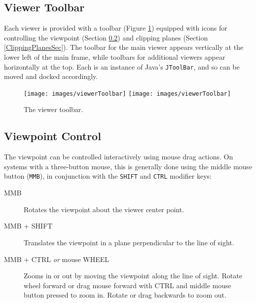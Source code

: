 \documentclass{article}
\begin{document}
\subsection{Viewer Toolbar}

Each viewer is provided with a toolbar (Figure \ref{ViewerToolbarFig}) equipped
with icons for controlling the viewpoint (Section \ref{ViewpointControlSec}) and
clipping planes (Section \ref{ClippingPlanesSec}). The toolbar for the main viewer
appears vertically at the lower left of the main frame, while toolbars
for additional viewers appear horizontally at the top.  Each is an
instance of Java's {\tt JToolBar}, and so can be moved and docked
accordingly.

\begin{figure}
\begin{center}
\iflatexml
\texttt{[image: images/viewerToolbar]}
\else
\texttt{[image: images/viewerToolbar]}
\fi
\end{center}
\caption{The viewer toolbar.}%
\label{ViewerToolbarFig}
\end{figure}

\subsection{Viewpoint Control}
\label{ViewpointControlSec}

The viewpoint can be controlled interactively using mouse drag
actions.  On systems with a three-button mouse, this is generally done
using the middle mouse button ({\tt MMB}), in conjunction with the
{\tt SHIFT} and {\tt CTRL} modifier keys:

\begin{description}

\item[MMB] \mbox{}

Rotates the viewpoint about the viewer center point.

\item[MMB + SHIFT] \mbox{}

Translates the viewpoint in a plane perpendicular to the
line of sight.

\item[MMB + CTRL {\it or} mouse WHEEL] \mbox{}

Zooms in or out by moving the viewpoint along the line of sight. Rotate 
wheel forward or drag mouse forward with CTRL and middle mouse button 
pressed to zoom in. Rotate or drag backwards to zoom out.

\end{description}
\end{document}
